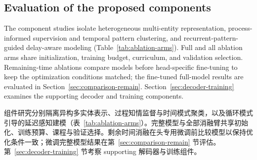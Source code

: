 \documentclass[a4paper,fleqn]{cas-dc}
\newcommand{\zhpara}[1]{%
  \par\begingroup\small\color{black!72}\noindent #1\par\endgroup}
\begin{document}
\subsection{Evaluation of the proposed components}

The component studies isolate heterogeneous multi-entity representation, process-informed supervision and temporal pattern clustering, and recurrent-pattern-guided delay-aware modeling (Table~\ref{tab:ablation-arms}). Full and all ablation arms share initialization, training budget, curriculum, and validation selection. Remaining-time ablations compare models before head-specific fine-tuning to keep the optimization conditions matched; the fine-tuned full-model results are evaluated in Section~\ref{sec:comparison-remain}. Section~\ref{sec:decoder-training} examines the supporting decoder and training components.

\zhpara{组件研究分别隔离异构多实体表示、过程知情监督与时间模式聚类，以及循环模式引导的延迟感知建模（表~\ref{tab:ablation-arms}）。完整模型与全部消融臂共享初始化、训练预算、课程与验证选择。剩余时间消融在头专用微调前比较模型以保持优化条件一致；微调完整模型结果在第~\ref{sec:comparison-remain} 节评估。第~\ref{sec:decoder-training} 节考察 supporting 解码器与训练组件。}
\end{document}
